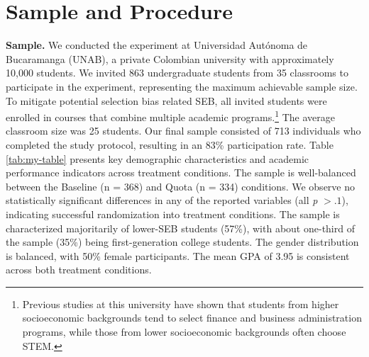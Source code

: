 \documentclass[11pt,a4paper,oneside]{article}
\begin{document}
\section{Sample and Procedure}
\textbf{Sample.} We conducted the experiment at Universidad Autónoma de Bucaramanga (UNAB), a private Colombian university with approximately 10,000 students. We invited 863 undergraduate students from 35 classrooms to participate in the experiment, representing the maximum achievable sample size. To mitigate potential selection bias related SEB, all invited students were enrolled in courses that combine multiple academic programs.\footnote{Previous studies at this university have shown that students from higher socioeconomic backgrounds tend to select finance and business administration programs, while those from lower socioeconomic backgrounds often choose STEM.} The average classroom size was 25 students. Our final sample consisted of 713 individuals who completed the study protocol, resulting in an 83\% participation rate. Table \ref{tab:my-table} presents key demographic characteristics and academic performance indicators across treatment conditions. The sample is well-balanced between the Baseline (n = 368) and Quota (n = 334) conditions. We observe no statistically significant differences in any of the reported variables (all \textit{p} $> .1$), indicating successful randomization into treatment conditions. The sample is characterized majoritarily of lower-SEB students (57\%), with about one-third of the sample (35\%) being first-generation college students. The gender distribution is balanced, with 50\% female participants. The mean GPA of 3.95 is consistent across both treatment conditions.
\end{document}
